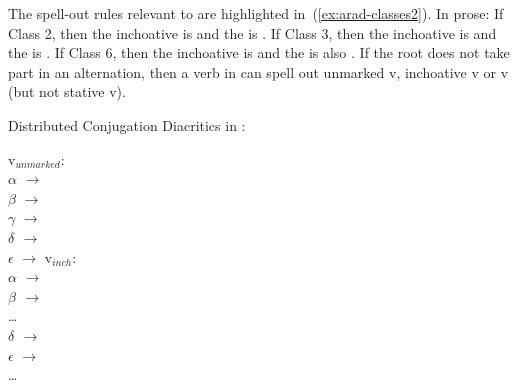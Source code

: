 \begin{exe}
\begin{xlist}
\begin{xlist}
\begin{exe}
\begin{exe}
\begin{xlist}
\begin{exe}
\begin{xlist}
\begin{exe}
\begin{xlist}
\begin{xlist}
\begin{exe}
\begin{xlist}
\begin{exe}
\begin{xlist}
\begin{exe}
\begin{exe}
\begin{exe}
\begin{xlist}
\begin{exe}
\begin{exe}
\begin{xlist}
\begin{xlist}
\begin{exe}
\begin{xlist}
\begin{exe}
\begin{exe}
\begin{exe}
\begin{xlist}
\begin{exe}
\begin{exe}
\begin{xlist}
\begin{exe}
\begin{xlist}
\begin{exe}
\begin{xlist}
\begin{exe}
\begin{xlist}
\begin{exe}
\begin{exe}
\begin{xlist}
\begin{exe}
\begin{exe}
\begin{xlist}
\begin{xlist}
\begin{exe}
\begin{xlist}
\begin{xlist}
\begin{exe}
\begin{xlist}
\begin{exe}
\begin{xlist}
\begin{exe}
\begin{xlist}
\begin{exe}
\begin{xlist}
\begin{exe}
\begin{exe}
\begin{exe}
\begin{exe}
\begin{xlist}
\begin{exe}
\begin{exe}
\begin{xlist}
\begin{xlist}
\begin{exe}
\begin{exe}
\begin{xlist}
The spell-out rules relevant to {\thif} are highlighted in~(\ref{ex:arad-classes2}). In prose: If Class 2, then the inchoative is {\tkal} and the  is {\thif}. If Class 3, then the inchoative is {\tnif} and the  is {\thif}. If Class 6, then the inchoative is {\thif} and the  is also {\thif}. If the root does not take part in an alternation, then a verb in {\thif} can spell out unmarked v, inchoative v or  v (but not stative v).
 \begin{exe}
 \ex  Distributed Conjugation Diacritics in \citet[230]{arad05}: \label{ex:arad-classes2} 
 \begin{xlist} 
\begin{multicols}{2}
 	\ex   v$_{unmarked}$: \\
			$ \alpha$ $\rightarrow$ {\tkal} \\
			$\beta$ $\rightarrow$ {\tnif}\\
			$\gamma$ $\rightarrow$ {\tpie}\\
			\textbf{$\delta$ $\rightarrow$ {\thif}}\\
			$\epsilon$ $\rightarrow$ {\thit}
 	\ex  v$_{inch}$: \\
			$ \alpha$ $\rightarrow$ {\tkal} \\
			\textbf{$\beta$ $\rightarrow$ {\tnif}} \\
			\dots \\
			\textbf{$\delta$ $\rightarrow$ {\thif}}\\
			$\epsilon$ $\rightarrow$ {\thit}\\
			\dots \\

\end{multicols}
\end{xlist}
\end{exe}
\end{xlist}
\end{exe}
\end{exe}
\end{xlist}
\end{xlist}
\end{exe}
\end{exe}
\end{xlist}
\end{exe}
\end{exe}
\end{exe}
\end{exe}
\end{xlist}
\end{exe}
\end{xlist}
\end{exe}
\end{xlist}
\end{exe}
\end{xlist}
\end{exe}
\end{xlist}
\end{xlist}
\end{exe}
\end{xlist}
\end{xlist}
\end{exe}
\end{exe}
\end{xlist}
\end{exe}
\end{exe}
\end{xlist}
\end{exe}
\end{xlist}
\end{exe}
\end{xlist}
\end{exe}
\end{xlist}
\end{exe}
\end{exe}
\end{xlist}
\end{exe}
\end{exe}
\end{exe}
\end{xlist}
\end{exe}
\end{xlist}
\end{xlist}
\end{exe}
\end{exe}
\end{xlist}
\end{exe}
\end{exe}
\end{exe}
\end{xlist}
\end{exe}
\end{xlist}
\end{exe}
\end{xlist}
\end{xlist}
\end{exe}
\end{xlist}
\end{exe}
\end{xlist}
\end{exe}
\end{exe}
\end{xlist}
\end{xlist}
\end{exe}
